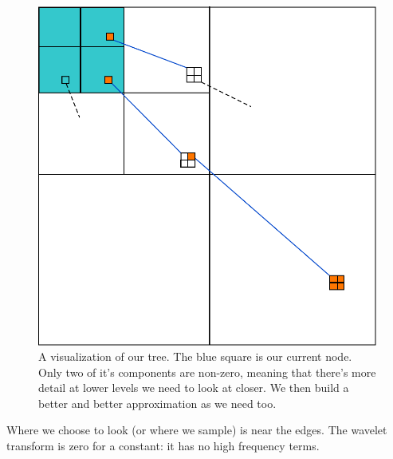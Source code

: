 \documentclass[leqno]{article}
\begin{document}
            \begin{figure}[h]
                \includegraphics[angle=0]{better_diagram}
                \caption{A visualization of our tree. The blue square is our current node. Only two of it's components are non-zero, meaning that there's more detail at lower levels we need to look at closer. We then build a better and better approximation as we need too.}
                \label{fig:tree}
            \end{figure}
            
            Where we choose to look (or where we sample) is near the edges. The wavelet transform is zero for a constant: it has no high frequency terms.




            
            
            \printbibliography{}
\end{document}
